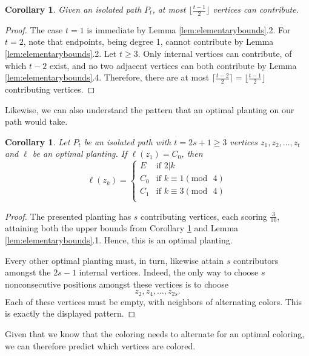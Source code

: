 \documentclass[11pt]{article}
\theoremstyle{plain}
\newtheorem{corollary}[theorem]{Corollary}
\begin{document}
\begin{corollary} \label{cor:armcontribute}
    Given an isolated path $P_{t}$, at most $\lfloor \frac{t-1}{2} \rfloor$ vertices can contribute.
\end{corollary}
\begin{proof}
    The case $t=1$ is immediate by Lemma \ref{lem:elementarybounds}.2. For $t=2$, note that endpoints, being degree 1, cannot contribute by Lemma \ref{lem:elementarybounds}.2. Let $t \geq 3$. Only internal vertices can contribute, of which $t-2$ exist, and no two adjacent vertices can both contribute by Lemma \ref{lem:elementarybounds}.4. Therefore, there are at most $\lceil \frac{t-2}{2}\rceil = \lfloor \frac{t-1}{2} \rfloor$ contributing vertices.
\end{proof}

Likewise, we can also understand the pattern that an optimal planting on our path would take. 

\begin{corollary} \label{cor:altcolorpattern}
    Let $P_t$ be an isolated path with $t=2s+1 \geq 3$ vertices $z_1, z_2, \dots, z_t$ and $\ell$ be an optimal planting. If $\ell (z_1) = C_0$, then
    \[
    \ell(z_k) = \begin{cases}
        E & \text{if } 2|k\\
        C_0 & \text{if } k \equiv 1 (\mathrm{mod} \text{ } 4) \\
        C_1 & \text{if } k \equiv 3 (\mathrm{mod} \text{ } 4) \\
    \end{cases}
    \]
\end{corollary}

\begin{proof}
    The presented planting has $s$ contributing vertices, each scoring $\frac{3}{10}$, attaining both the upper bounds from Corollary \ref{cor:armcontribute} and Lemma \ref{lem:elementarybounds}.1. Hence, this is an optimal planting.

    Every other optimal planting must, in turn, likewise attain $s$ contributors amongst the $2s-1$ internal vertices. Indeed, the only way to choose $s$ nonconsecutive positions amongst these vertices is to choose
    \[z_2, z_4, \dots, z_{2s}.\]
    Each of these vertices must be empty, with neighbors of alternating colors. This is exactly the displayed pattern.
\end{proof}

Given that we know that the coloring needs to alternate for an optimal coloring, we can therefore predict which vertices are colored.
\end{document}
